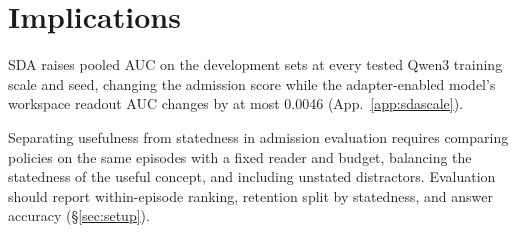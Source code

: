 \section{Implications}
\label{sec:implications}

SDA raises pooled AUC on the development sets at every tested
Qwen3 training scale and seed, changing the admission score while
the adapter-enabled model's workspace readout AUC changes by at most
0.0046 (App.~\ref{app:sdascale}).

Separating usefulness from statedness in admission evaluation
requires comparing policies on the same episodes with a fixed
reader and budget, balancing the statedness of the useful concept,
and including unstated distractors. Evaluation should report
within-episode ranking, retention split by statedness, and answer
accuracy (\S\ref{sec:setup}).
